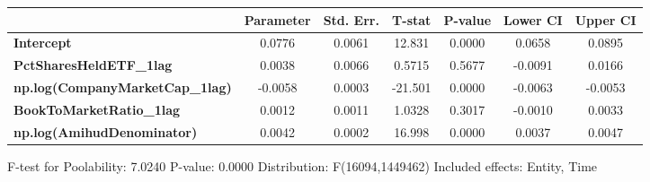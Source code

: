 \begin{center}
\begin{tabular}{lclc}
\bottomrule
\end{tabular}
\begin{tabular}{lcccccc}
                                        & \textbf{Parameter} & \textbf{Std. Err.} & \textbf{T-stat} & \textbf{P-value} & \textbf{Lower CI} & \textbf{Upper CI}  \\
\midrule
\textbf{Intercept}                      &       0.0776       &       0.0061       &      12.831     &      0.0000      &       0.0658      &       0.0895       \\
\textbf{PctSharesHeldETF\_1lag}         &       0.0038       &       0.0066       &      0.5715     &      0.5677      &      -0.0091      &       0.0166       \\
\textbf{np.log(CompanyMarketCap\_1lag)} &      -0.0058       &       0.0003       &     -21.501     &      0.0000      &      -0.0063      &      -0.0053       \\
\textbf{BookToMarketRatio\_1lag}        &       0.0012       &       0.0011       &      1.0328     &      0.3017      &      -0.0010      &       0.0033       \\
\textbf{np.log(AmihudDenominator)}      &       0.0042       &       0.0002       &      16.998     &      0.0000      &       0.0037      &       0.0047       \\
\bottomrule
\end{tabular}
\end{center}

F-test for Poolability: 7.0240 \newline
 P-value: 0.0000 \newline
 Distribution: F(16094,1449462) \newline
  \newline
 Included effects: Entity, Time